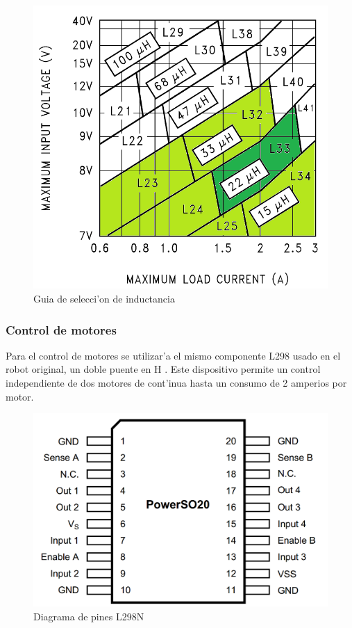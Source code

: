 \documentclass[twoside,12pt]{article}
\begin{document}
\begin{figure}[ht]
\centering
\includegraphics[scale=0.30]{images/bobina_graph.png}
\caption{Guia de selecci'on de inductancia}
\label{fig:Bobina_Graph}
\end{figure} 

\subsubsection{Control de motores} \label{sec:L298N}
Para el control de motores se utilizar'a el mismo componente L298 usado en el robot original, un doble puente en H . Este dispositivo permite un control independiente de dos motores de cont'inua hasta un consumo de 2 amperios por motor.\\

\begin{figure}[ht]
\centering
\includegraphics[scale=0.25]{images/L298_pin_diagram.png}
\caption{Diagrama de pines L298N}
\label{fig:L298N}
\end{figure} 
\end{document}
